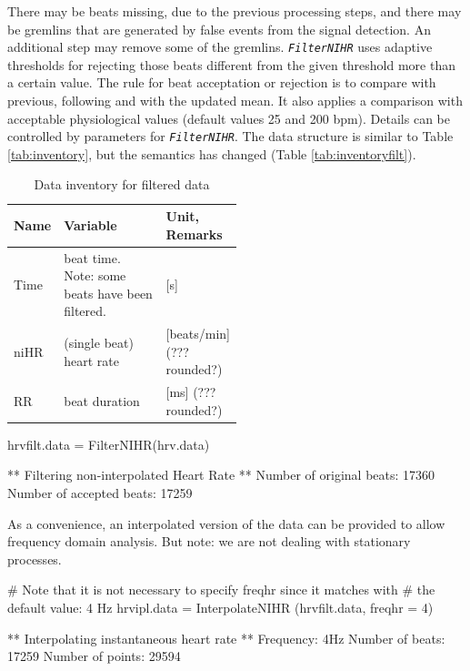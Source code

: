 \documentclass[a4paper, english, utf8]{amsart}
\newcommand\code[1]{\textsl{\texttt{#1}}}
\begin{document}
There may be beats missing, due to the previous processing steps, and there may be gremlins that are 
generated by false events from the signal detection. An additional step may remove  some of the gremlins. 
\code{FilterNIHR} uses adaptive thresholds for rejecting those beats different from the given threshold 
more than a certain value. The rule for beat acceptation or rejection is to compare with previous, following 
and with the updated mean. It also applies a comparison with acceptable physiological values (default 
values 25 and 200 bpm). Details can be controlled by parameters for \code{FilterNIHR}. The data 
structure is similar to Table \vref{tab:inventory}, 
but the semantics has changed (Table \vref{tab:inventoryfilt}).

\begin{table}
\begin{center}
\begin{tabular}{|l|p{0.5\linewidth}|l|}
\hline
\rowcolor[gray]{0.8}%
Name&Variable&Unit, Remarks\\
\hline
Time&beat time. Note: some beats have been filtered.&[s]\\
niHR&(single beat) heart rate&[beats/min] (??? rounded?)\\
RR&beat duration&[ms]  (??? rounded?)\\
\hline
\end{tabular}
\end{center}
\caption{Data inventory for filtered data}\label{tab:inventoryfilt}
\end{table}

\begin{Schunk}
\begin{Sinput}
  hrvfilt.data = FilterNIHR(hrv.data)
\end{Sinput}
\begin{Soutput}
** Filtering non-interpolated Heart Rate **
   Number of original beats: 17360 
   Number of accepted beats: 17259 
\end{Soutput}
\end{Schunk}

As a convenience, an interpolated version of the data can be provided to allow frequency domain analysis. But note: we are not dealing with stationary processes.

\begin{Schunk}
\begin{Sinput}
  # Note that it is not necessary to specify freqhr since it matches with
  # the default value: 4 Hz
  hrvipl.data = InterpolateNIHR (hrvfilt.data, freqhr = 4)
\end{Sinput}
\begin{Soutput}
** Interpolating instantaneous heart rate **
   Frequency: 4Hz
   Number of beats: 17259 
   Number of points: 29594 
\end{Soutput}
\end{Schunk}
\end{document}
